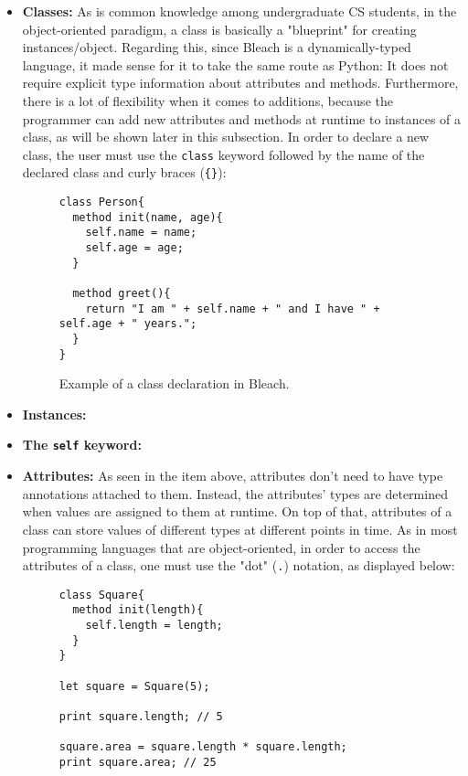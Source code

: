 \begin{itemize}
    \item \textbf{Classes:} As is common knowledge among undergraduate CS students, in the object-oriented paradigm, a class is basically a "blueprint" for creating instances/object. Regarding this, since Bleach is a dynamically-typed language, it made sense for it to take the same route as Python: It does not require explicit type information about attributes and methods. Furthermore, there is a lot of flexibility when it comes to additions, because the programmer can add new attributes and methods at runtime to instances of a class, as will be shown later in this subsection. In order to declare a new class, the user must use the \texttt{class} keyword followed by the name of the declared class and curly braces (\texttt{\{\}}):
\begin{figure}[H]
    \centering
    \begin{lstlisting}
class Person{
  method init(name, age){
    self.name = name;
    self.age = age;
  }

  method greet(){
    return "I am " + self.name + " and I have " + self.age + " years.";
  }
}
    \end{lstlisting}
    \caption{Example of a class declaration in Bleach.}
\end{figure}

    \item \textbf{Instances:}
    
    \item \textbf{The \texttt{self} keyword:}
    
    \item \textbf{Attributes:} As seen in the item above, attributes don't need to have type annotations attached to them. Instead, the attributes' types are determined when values are assigned to them at runtime. On top of that, attributes of a class can store values of different types at different points in time. As in most programming languages that are object-oriented, in order to access the attributes of a class, one must use the "dot" (\texttt{.}) notation, as displayed below:
\begin{figure}[H]
    \centering
    \begin{lstlisting}
class Square{
  method init(length){
    self.length = length;
  }
}

let square = Square(5);

print square.length; // 5

square.area = square.length * square.length;
print square.area; // 25


\end{lstlisting}
\end{figure}
\end{itemize}
